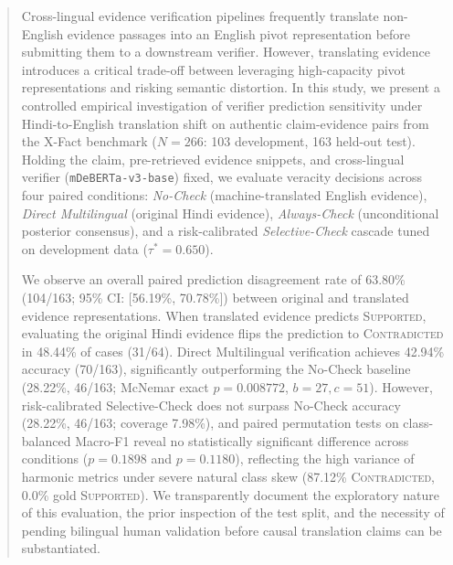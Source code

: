 \begin{abstract}
Cross-lingual evidence verification pipelines frequently translate non-English evidence passages into an English pivot representation before submitting them to a downstream verifier. However, translating evidence introduces a critical trade-off between leveraging high-capacity pivot representations and risking semantic distortion. In this study, we present a controlled empirical investigation of verifier prediction sensitivity under Hindi-to-English translation shift on authentic claim-evidence pairs from the X-Fact benchmark ($N=266$: 103 development, 163 held-out test). Holding the claim, pre-retrieved evidence snippets, and cross-lingual verifier (\texttt{mDeBERTa-v3-base}) fixed, we evaluate veracity decisions across four paired conditions: \emph{No-Check} (machine-translated English evidence), \emph{Direct Multilingual} (original Hindi evidence), \emph{Always-Check} (unconditional posterior consensus), and a risk-calibrated \emph{Selective-Check} cascade tuned on development data ($\tau^*=0.650$).

We observe an overall paired prediction disagreement rate of 63.80\% (104/163; 95\% CI: [56.19\%, 70.78\%]) between original and translated evidence representations. When translated evidence predicts \textsc{Supported}, evaluating the original Hindi evidence flips the prediction to \textsc{Contradicted} in 48.44\% of cases (31/64). Direct Multilingual verification achieves 42.94\% accuracy (70/163), significantly outperforming the No-Check baseline (28.22\%, 46/163; McNemar exact $p = 0.008772$, $b=27, c=51$). However, risk-calibrated Selective-Check does not surpass No-Check accuracy (28.22\%, 46/163; coverage 7.98\%), and paired permutation tests on class-balanced Macro-F1 reveal no statistically significant difference across conditions ($p = 0.1898$ and $p = 0.1180$), reflecting the high variance of harmonic metrics under severe natural class skew (87.12\% \textsc{Contradicted}, 0.0\% gold \textsc{Supported}). We transparently document the exploratory nature of this evaluation, the prior inspection of the test split, and the necessity of pending bilingual human validation before causal translation claims can be substantiated.
\end{abstract}
